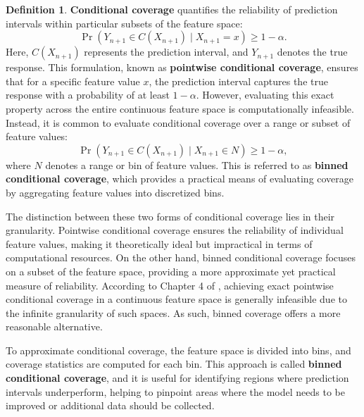 \documentclass{article}
\theoremstyle{definition}
\newtheorem{definition}{Definition}
\begin{document}
\begin{definition}
\textbf{Conditional coverage} quantifies the reliability of prediction intervals within particular subsets of the feature space:
\begin{equation}
\Pr\left(Y_{n+1} \in C(X_{n+1}) \mid X_{n+1} = x \right) \geq 1 - \alpha.
\end{equation}
Here, $C(X_{n+1})$ represents the prediction interval, and $Y_{n+1}$ denotes the true response. This formulation, known as \textbf{pointwise conditional coverage}, ensures that for a specific feature value $x$, the prediction interval captures the true response with a probability of at least $1 - \alpha$. However, evaluating this exact property across the entire continuous feature space is computationally infeasible. Instead, it is common to evaluate conditional coverage over a range or subset of feature values:
\begin{equation}
\Pr\left(Y_{n+1} \in C(X_{n+1}) \mid X_{n+1} \in N \right) \geq 1 - \alpha,
\end{equation}
where $N$ denotes a range or bin of feature values. This is referred to as \textbf{binned conditional coverage}, which provides a practical means of evaluating coverage by aggregating feature values into discretized bins.
\end{definition}

The distinction between these two forms of conditional coverage lies in their granularity. Pointwise conditional coverage ensures the reliability of individual feature values, making it theoretically ideal but impractical in terms of computational resources. On the other hand, binned conditional coverage focuses on a subset of the feature space, providing a more approximate yet practical measure of reliability. According to Chapter 4 of \cite{angelopoulos2024theoretical-foundations-cp}, achieving exact pointwise conditional coverage in a continuous feature space is generally infeasible due to the infinite granularity of such spaces. As such, binned coverage offers a more reasonable alternative.

To approximate conditional coverage, the feature space is divided into bins, and coverage statistics are computed for each bin. This approach is called \textbf{binned conditional coverage}, and it is useful for identifying regions where prediction intervals underperform, helping to pinpoint areas where the model needs to be improved or additional data should be collected.
\end{document}
